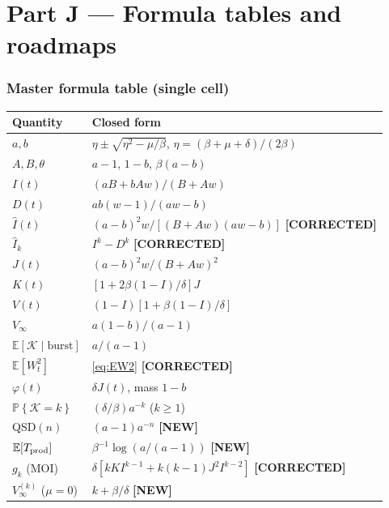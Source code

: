 \documentclass[11pt,a4paper]{article}
\newcommand{\E}{\mathbb{E}}
\newcommand{\Prob}[1]{\mathbb{P}\!\left\{#1\right\}}
\newcommand{\wt}{W_t}
\newcommand{\Ihat}{\widehat{I}}
\newcommand{\Kb}{\mathcal{K}}
\newcommand{\Aa}{A}
\newcommand{\Bb}{B}
\theoremstyle{plain}
\theoremstyle{definition}
\theoremstyle{remark}
\newcommand{\COR}{\textcolor{green!40!black}{\textbf{[CORRECTED]}}}
\newcommand{\NEW}{\textcolor{blue!55!black}{\textbf{[NEW]}}}
\begin{document}
\part*{Part J --- Formula tables and roadmaps}

\section{Master formula table (single cell)}
\label{sec:table-sc}

\begin{center}
\renewcommand{\arraystretch}{1.35}
\begin{tabular}{@{}p{}p{}@{}}
\toprule
Quantity & Closed form \\
\midrule
$a,b$ & $\eta\pm\sqrt{\eta^2-\mu/\beta}$, $\eta=(\beta+\mu+\delta)/(2\beta)$ \\
$\Aa,\Bb,\theta$ & $a-1$, $1-b$, $\beta(a-b)$ \\
$I(t)$ & $(a\Bb+b\Aa w)/(\Bb+\Aa w)$ \\
$D(t)$ & $ab(w-1)/(aw-b)$ \\
$\Ihat(t)$ & $(a-b)^2 w/[(\Bb+\Aa w)(aw-b)]$ \COR \\
$\Ihat_k$ & $I^k-D^k$ \COR \\
$J(t)$ & $(a-b)^2 w/(\Bb+\Aa w)^2$ \\
$K(t)$ & $[1+2\beta(1-I)/\delta]J$ \\
$V(t)$ & $(1-I)[1+\beta(1-I)/\delta]$ \\
$V_\infty$ & $a(1-b)/(a-1)$ \\
$\E[\Kb\mid\text{burst}]$ & $a/(a-1)$ \\
$\E[\wt^2]$ & \eqref{eq:EW2} \COR \\
$\varphi(t)$ & $\delta J(t)$, mass $1-b$ \\
$\Prob{\Kb=k}$ & $(\delta/\beta)a^{-k}$ ($k\ge 1$) \\
QSD$(n)$ & $(a-1)a^{-n}$ \NEW \\
$\E[T_{\rm prod}]$ & $\beta^{-1}\log(a/(a-1))$ \NEW \\
$g_k$ (MOI) & $\delta[kKI^{k-1}+k(k-1)J^2 I^{k-2}]$ \COR \\
$V_\infty^{(k)}$ ($\mu=0$) & $k+\beta/\delta$ \NEW \\
\bottomrule
\end{tabular}
\end{center}
\end{document}
